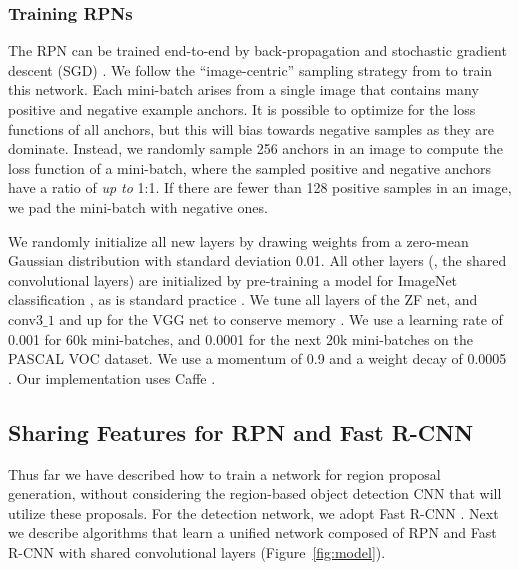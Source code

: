 \documentclass[10pt,journal,cspaper,compsoc]{IEEEtran}
\begin{document}
\subsubsection{Training RPNs}
\label{sec:training_rpn}

The RPN can be trained end-to-end by back-propagation and stochastic gradient descent (SGD) \cite{LeCun1989}.
We follow the ``image-centric'' sampling strategy from \cite{Girshick2015a} to train this network. Each mini-batch arises from a single image that contains many positive and negative example anchors. It is possible to optimize for the loss functions of all anchors, but this will bias towards negative samples as they are dominate. Instead, we randomly sample 256 anchors in an image to compute the loss function of a mini-batch, where the sampled positive and negative anchors have a ratio of \emph{up to} 1:1. If there are fewer than 128 positive samples in an image, we pad the mini-batch with negative ones.

We randomly initialize all new layers by drawing weights from a zero-mean Gaussian distribution with standard deviation 0.01. All other layers (\ie, the shared convolutional layers) are initialized by pre-training a model for ImageNet classification \cite{Russakovsky2015}, as is standard practice \cite{Girshick2014}. We tune all layers of the ZF net, and conv3$\_1$ and up for the VGG net to conserve memory \cite{Girshick2015a}.
We use a learning rate of 0.001 for 60k mini-batches, and 0.0001 for the next 20k mini-batches on the PASCAL VOC dataset. We use a momentum of 0.9 and a weight decay of 0.0005 \cite{Krizhevsky2012}. Our implementation uses Caffe \cite{Jia2014}.

\subsection{Sharing Features for RPN and Fast R-CNN}
\label{sec:training}

Thus far we have described how to train a network for region proposal generation, without considering the region-based object detection CNN that will utilize these proposals.
For the detection network, we adopt Fast R-CNN \cite{Girshick2015a}.
Next we describe algorithms that learn a unified network composed of RPN and Fast R-CNN with shared convolutional layers (Figure~\ref{fig:model}).
\end{document}

